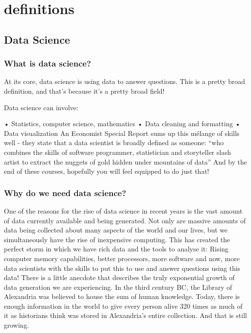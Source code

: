 \documentclass[
]{book}
\begin{document}
\hypertarget{definitions}{%
\section{definitions}\label{definitions}}

\hypertarget{data-science}{%
\subsection{Data Science}\label{data-science}}

\hypertarget{what-is-data-science}{%
\subsubsection{What is data science?}\label{what-is-data-science}}

At its core, data science is using data to answer questions. This is a pretty broad definition, and that's because it's a pretty broad field!

Data science can involve:

• Statistics, computer science, mathematics
• Data cleaning and formatting
• Data visualization
An Economist Special Report sums up this mélange of skills well - they state that a data scientist is broadly defined as someone:
``who combines the skills of software programmer, statistician and storyteller slash artist to extract the nuggets of gold hidden under mountains of data''
And by the end of these courses, hopefully you will feel equipped to do just that!

\hypertarget{why-do-we-need-data-science}{%
\subsubsection{Why do we need data science?}\label{why-do-we-need-data-science}}

One of the reasons for the rise of data science in recent years is the vast amount of data currently available and being generated. Not only are massive amounts of data being collected about many aspects of the world and our lives, but we simultaneously have the rise of inexpensive computing. This has created the perfect storm in which we have rich data and the tools to analyse it: Rising computer memory capabilities, better processors, more software and now, more data scientists with the skills to put this to use and answer questions using this data!
There is a little anecdote that describes the truly exponential growth of data generation we are experiencing. In the third century BC, the Library of Alexandria was believed to house the sum of human knowledge. Today, there is enough information in the world to give every person alive 320 times as much of it as historians think was stored in Alexandria's entire collection.
And that is still growing.
\end{document}
